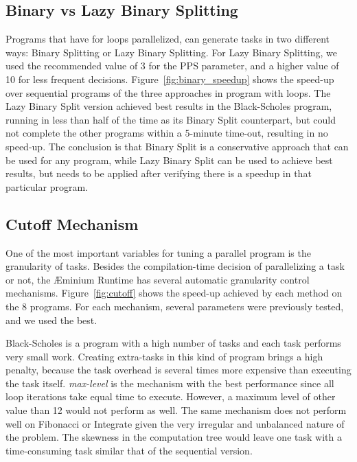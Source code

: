 \documentclass[smallextended]{svjour3}
\begin{document}
\subsection{Binary vs Lazy Binary Splitting}




Programs that have for loops parallelized, can generate tasks in two different ways: Binary Splitting or Lazy Binary Splitting. For Lazy Binary Splitting, we used the recommended value of 3 for the PPS parameter, and a higher value of 10 for less frequent decisions. Figure~\ref{fig:binary_speedup} shows the speed-up over sequential programs of the three approaches in program with loops. The Lazy Binary Split version achieved best results in the Black-Scholes program, running in less than half of the time as its Binary Split counterpart, but could not complete the other programs within a 5-minute time-out, resulting in no speed-up. The conclusion is that Binary Split is a conservative approach that can be used for any program, while Lazy Binary Split can be used to achieve best results, but needs to be applied after verifying there is a speedup in that particular program.


\subsection{Cutoff Mechanism}

One of the most important variables for tuning a parallel program is the granularity of tasks. Besides the compilation-time decision of parallelizing a task or not, the Æminium Runtime has several automatic granularity control mechanisms. Figure~\ref{fig:cutoff} shows the speed-up achieved by each method on the 8 programs. For each mechanism, several parameters were previously tested, and we used the best.


Black-Scholes is a program with a high number of tasks and each task performs very small work. Creating extra-tasks in this kind of program brings a high penalty, because the task overhead is several times more expensive than executing the task itself. \emph{max-level} is the mechanism with the best performance since all loop iterations take equal time to execute. However, a maximum level of other value than 12 would not perform as well. The same mechanism does not perform well on Fibonacci or Integrate given the very irregular and unbalanced nature of the problem. The skewness in the computation tree would leave one task with a time-consuming task similar that of the sequential version.
\end{document}
